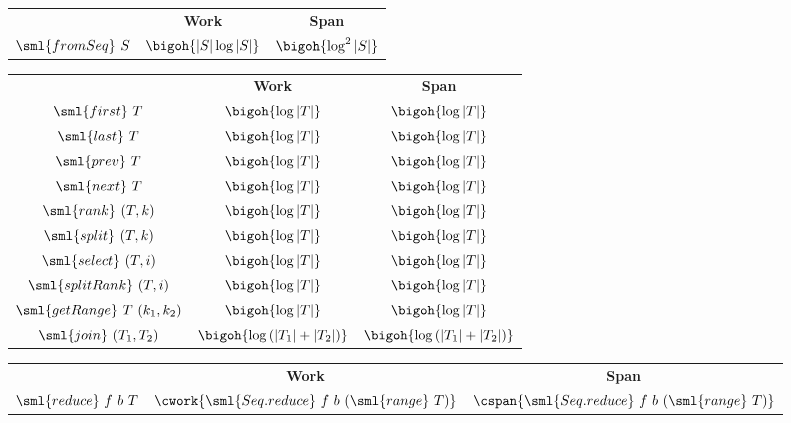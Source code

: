 \begin{cluster}
\label{grp:cst:treap-aug-table::tables-from-sequences}

\begin{costspec}
\label{cst:treap-aug-table::tables-from-sequences}
\begin{tabular}{c|c|c}
& \textbf{Work} & \textbf{Span} \\
$\sml{fromSeq}~S$ & $\bigoh{|S|\log|S|}$ & $\bigoh{\log^2|S|}$
\end{tabular}

\end{costspec}
\end{cluster}

\begin{cluster}
\label{grp:cst:treap-aug-table::ordered-table-operations}

\begin{costspec}
\label{cst:treap-aug-table::ordered-table-operations}
\begin{tabular}{c|c|c}
& \textbf{Work} & \textbf{Span} \\
$\sml{first}~T$ & $\bigoh{\log|T|}$ & $\bigoh{\log|T|}$ \\
$\sml{last}~T$ & $\bigoh{\log|T|}$ & $\bigoh{\log|T|}$ \\
$\sml{prev}~T$ & $\bigoh{\log|T|}$ & $\bigoh{\log|T|}$ \\
$\sml{next}~T$ & $\bigoh{\log|T|}$ & $\bigoh{\log|T|}$ \\
$\sml{rank}~(T, k)$ & $\bigoh{\log|T|}$ & $\bigoh{\log|T|}$ \\
$\sml{split}~(T, k)$ & $\bigoh{\log|T|}$ & $\bigoh{\log|T|}$ \\
$\sml{select}~(T, i)$ & $\bigoh{\log|T|}$ & $\bigoh{\log|T|}$ \\
$\sml{splitRank}~(T, i)$ & $\bigoh{\log|T|}$ & $\bigoh{\log|T|}$ \\
$\sml{getRange}~T~(k_1, k_2)$ & $\bigoh{\log|T|}$ & $\bigoh{\log|T|}$
\\
$\sml{join}~(T_1, T_2)$ &
$\bigoh{\log\left(|T_1| + |T_2|\right)}$ &
$\bigoh{\log\left(|T_1| + |T_2|\right)}$
\end{tabular}

\end{costspec}
\end{cluster}

\begin{cluster}
\label{grp:cst:treap-aug-table::reduce}

\begin{costspec}[Reduce]
\label{cst:treap-aug-table::reduce}
\begin{tabular}{c|c|c}
& \textbf{Work} & \textbf{Span} \\
$\sml{reduce}~f~b~T$ &
$\cwork{\sml{Seq.reduce}~f~b~(\sml{range}~T)}$ &
$\cspan{\sml{Seq.reduce}~f~b~(\sml{range}~T)}$
\end{tabular}

\end{costspec}
\end{cluster}

